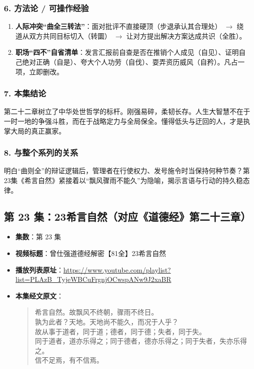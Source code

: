 \subsubsection{6. 方法论 / 可操作经验}
\begin{enumerate}
    \item \textbf{人际冲突“曲全三转法”}：面对批评不直接硬顶（步退承认其合理处） $\rightarrow$ 绕道从双方共同目标切入（转圜） $\rightarrow$ 让对方提出解决方案达成共识（全胜）。
    \item \textbf{职场“四不”自省清单}：发言汇报前自查是否在推销个人成见（自见）、证明自己绝对正确（自是）、夸大个人功劳（自伐）、耍弄资历威风（自矜）。凡占一项，立即删改。
\end{enumerate}

\subsubsection{7. 本集结论}
第二十二章树立了中华处世哲学的标杆。刚强易碎，柔韧长存。人生大智慧不在于一时一地的争强斗胜，而在于战略定力与全局保全。懂得低头与迂回的人，才是执掌大局的真正赢家。

\subsubsection{8. 与整个系列的关系}
明白“曲则全”的辩证逻辑后，管理者在行使权力、发号施令时当保持何种节奏？第23集《希言自然》紧接着以“飘风骤雨不能久”为隐喻，揭示言语与行动的持久稳态律。

\clearpage

\subsection{第 23 集：23希言自然（对应《道德经》第二十三章）}
\label{sec:ep23}

\begin{itemize}
    \item \textbf{集数}：第 23 集
    \item \textbf{视频标题}：曾仕强道德经解密【81全】23希言自然
    \item \textbf{播放列表原址}：\url{https://www.youtube.com/playlist?list=PLAzB_TyjeWBCuFrgnjOCwspANw9J2xaBR}
    \item \textbf{本集经文原文}：
    \begin{quote}\kaishu
    希言自然。故飘风不终朝，骤雨不终日。\\
    孰为此者？天地。天地尚不能久，而况于人乎？\\
    故从事于道者，同于道；德者，同于德；失者，同于失。\\
    同于道者，道亦乐得之；同于德者，德亦乐得之；同于失者，失亦乐得之。\\
    信不足焉，有不信焉。
    \end{quote}
\end{itemize}

